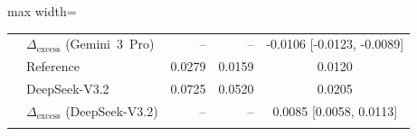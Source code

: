 \begin{table}[H]
\begin{adjustbox}{max width=\textwidth}
\begin{tabular}{llrrrr}
 & $\Delta_{\mathrm{excess}}$ (Gemini~3~Pro) & -- & -- & \multicolumn{2}{c}{-0.0106 [-0.0123, -0.0089]} \\
\addlinespace
 & Reference & 0.0279 & 0.0159 & \multicolumn{2}{c}{0.0120} \\
 & DeepSeek-V3.2 & 0.0725 & 0.0520 & \multicolumn{2}{c}{0.0205} \\
 & $\Delta_{\mathrm{excess}}$ (DeepSeek-V3.2) & -- & -- & \multicolumn{2}{c}{0.0085 [0.0058, 0.0113]} \\
\addlinespace
\bottomrule
\end{tabular}
\end{adjustbox}
\end{table}